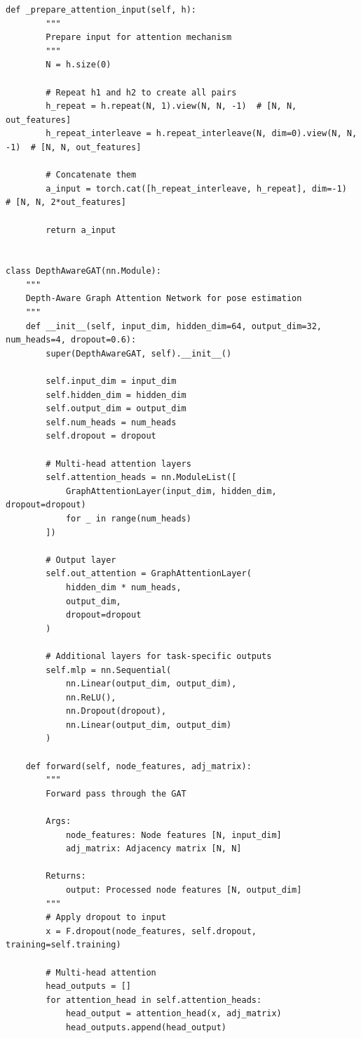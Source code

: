 \begin{lstlisting}[style=pythonstyle,title={Basic Gat Code},label={code:basic_gat}]
    def _prepare_attention_input(self, h):
        """
        Prepare input for attention mechanism
        """
        N = h.size(0)
        
        # Repeat h1 and h2 to create all pairs
        h_repeat = h.repeat(N, 1).view(N, N, -1)  # [N, N, out_features]
        h_repeat_interleave = h.repeat_interleave(N, dim=0).view(N, N, -1)  # [N, N, out_features]
        
        # Concatenate them
        a_input = torch.cat([h_repeat_interleave, h_repeat], dim=-1)  # [N, N, 2*out_features]
        
        return a_input


class DepthAwareGAT(nn.Module):
    """
    Depth-Aware Graph Attention Network for pose estimation
    """
    def __init__(self, input_dim, hidden_dim=64, output_dim=32, num_heads=4, dropout=0.6):
        super(DepthAwareGAT, self).__init__()
        
        self.input_dim = input_dim
        self.hidden_dim = hidden_dim
        self.output_dim = output_dim
        self.num_heads = num_heads
        self.dropout = dropout
        
        # Multi-head attention layers
        self.attention_heads = nn.ModuleList([
            GraphAttentionLayer(input_dim, hidden_dim, dropout=dropout)
            for _ in range(num_heads)
        ])
        
        # Output layer
        self.out_attention = GraphAttentionLayer(
            hidden_dim * num_heads, 
            output_dim, 
            dropout=dropout
        )
        
        # Additional layers for task-specific outputs
        self.mlp = nn.Sequential(
            nn.Linear(output_dim, output_dim),
            nn.ReLU(),
            nn.Dropout(dropout),
            nn.Linear(output_dim, output_dim)
        )
        
    def forward(self, node_features, adj_matrix):
        """
        Forward pass through the GAT
        
        Args:
            node_features: Node features [N, input_dim]
            adj_matrix: Adjacency matrix [N, N]
            
        Returns:
            output: Processed node features [N, output_dim]
        """
        # Apply dropout to input
        x = F.dropout(node_features, self.dropout, training=self.training)
        
        # Multi-head attention
        head_outputs = []
        for attention_head in self.attention_heads:
            head_output = attention_head(x, adj_matrix)
            head_outputs.append(head_output)
        

\end{lstlisting}
